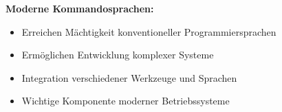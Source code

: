 \documentclass[9pt,a4paper]{extarticle}
\begin{document}
\begin{multicols*}{2}
\textbf{Moderne Kommandosprachen:}
\begin{itemize}
\item Erreichen Mächtigkeit konventioneller Programmiersprachen
\item Ermöglichen Entwicklung komplexer Systeme
\item Integration verschiedener Werkzeuge und Sprachen
\item Wichtige Komponente moderner Betriebssysteme
\end{itemize}

\end{multicols*}
\end{document}
